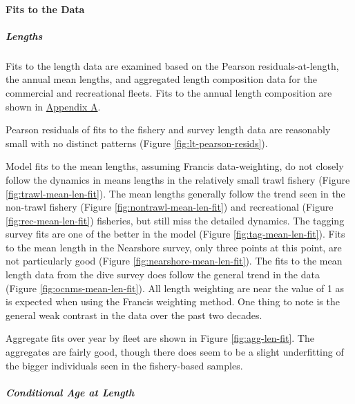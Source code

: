 \documentclass[11pt,
  letterpaper,
]{article}
\begin{document}
\hypertarget{fits-to-the-data}{%
\paragraph{Fits to the Data}\label{fits-to-the-data}}

\hypertarget{lengths}{%
\subparagraph{Lengths}\label{lengths}}

Fits to the length data are examined based on the Pearson residuals-at-length, the annual mean lengths, and aggregated length composition data for the commercial and recreational fleets. Fits to the annual length composition are shown in \protect\hyperlink{app_a}{Appendix A}.

Pearson residuals of fits to the fishery and survey length data are reasonably small with no distinct patterns (Figure \ref{fig:lt-pearson-resids}).

Model fits to the mean lengths, assuming Francis data-weighting, do not closely follow the dynamics in means lengths in the relatively small trawl fishery (Figure \ref{fig:trawl-mean-len-fit}). The mean lengths generally follow the trend seen in the non-trawl fishery (Figure \ref{fig:nontrawl-mean-len-fit}) and recreational (Figure \ref{fig:rec-mean-len-fit}) fisheries, but still miss the detailed dynamics. The tagging survey fits are one of the better in the model (Figure \ref{fig:tag-mean-len-fit}). Fits to the mean length in the Nearshore survey, only three points at this point, are not particularly good (Figure \ref{fig:nearshore-mean-len-fit}). The fits to the mean length data from the dive survey does follow the general trend in the data (Figure \ref{fig:ocnms-mean-len-fit}). All length weighting are near the value of 1 as is expected when using the Francis weighting method. One thing to note is the general weak contrast in the data over the past two decades.

Aggregate fits over year by fleet are shown in Figure \ref{fig:agg-len-fit}. The aggregates are fairly good, though there does seem to be a slight underfitting of the bigger individuals seen in the fishery-based samples.

\hypertarget{conditional-age-at-length}{%
\subparagraph{Conditional Age at Length}\label{conditional-age-at-length}}
\end{document}

